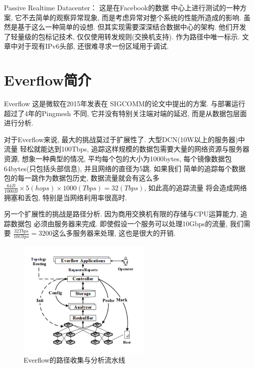 Passive Realtime Datacenter：\cite{roy2017passive} 这是在Facebook的数据
中心上进行测试的一种方案, 它不去简单的观察异常现象,
而是考虑异常对整个系统的性能所造成的影响. 虽然是基于这么一种简单的设想.
但其实现需要深深结合数据中心的架构. 他们开发了轻量级的包标记技术,
仅仅使用转发规则(交换机支持). 作为路径中唯一标示. 文章中对于现有IPv6头部, 
还很难寻求一份区域用于调试.


\section{Everflow简介}

  Everflow \cite{greenberg2016packet} 这是微软在2015年发表在
SIGCOMM的论文中提出的方案. 与部署运行超过了4年的Pingmesh\cite{guo2015pingmesh}
不同, 它并没有特别关注端对端的延迟, 而是从数据包层面进行分析.

  对于Everflow来说, 最大的挑战莫过于扩展性了. 大型DCN(10W以上的服务器)中流量
轻松就能达到100Tbps, 追踪这样规模的数据包需要大量的网络资源与服务器资源,
想象一种典型的情况, 平均每个包的大小为1000bytes,
每个镜像数据包64bytes(只包括头部信息), 并且网络的直径为5跳. 如果我们
简单的追踪每个数据包的每一跳作为数据包历史, 数据流量就会有这么多
$\frac{64B}{1000B} \times 5(hops) \times 1000(Tbps) = 32(Tbps)$, 如此高的追踪流量
将会造成网络拥塞和丢包, 特别是当网络利用率很高时.

  另一个扩展性的挑战是路径分析. 因为商用交换机有限的存储与CPU运算能力, 追踪数据包
必须由服务器来完成. 即使假设一个服务可以处理10Gbps的流量, 我们需要
$\frac{32Tbps}{10Gbps} = 3200$这么多服务器来处理, 这也是很大的开销.


\begin{figure}
  \centering
  \includegraphics[width=0.58\textwidth]{../img/everflow_arch.png}
  \caption{Everflow的路径收集与分析流水线}
  \label{fig:everflow_arch}
\end{figure}

